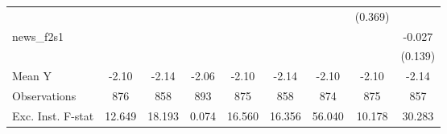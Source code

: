 {\begin{tabular}{l*{8}{c}}
            &                     &                     &                     &                     &                     &                     &     (0.369)         &                     \\
\addlinespace
news\_f2s1   &                     &                     &                     &                     &                     &                     &                     &      -0.027         \\
            &                     &                     &                     &                     &                     &                     &                     &     (0.139)         \\
\midrule
Mean Y      &       -2.10         &       -2.14         &       -2.06         &       -2.10         &       -2.14         &       -2.10         &       -2.10         &       -2.14         \\
Observations&         876         &         858         &         893         &         875         &         858         &         874         &         875         &         857         \\
Exc. Inst. F-stat&      12.649         &      18.193         &       0.074         &      16.560         &      16.356         &      56.040         &      10.178         &      30.283         \\
\bottomrule
\end{tabular}
}

